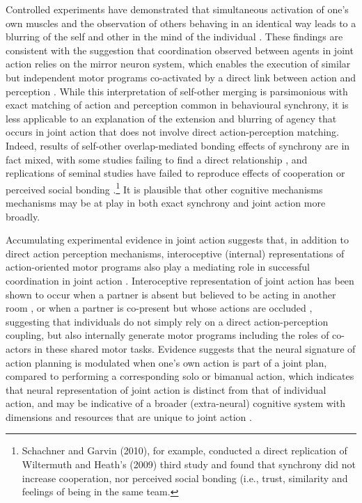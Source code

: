 Controlled experiments have demonstrated that simultaneous activation of one's own muscles and the observation of others behaving in an identical way leads to a blurring of the self and other in the mind of the individual \citep{Hurley2008,Rizzolatti2004}. These findings are consistent with the suggestion that coordination observed between agents in joint action relies on the mirror neuron system, which enables the execution of similar but independent motor programs co-activated by a direct link between action and perception \citep{Rizzolatti2004}.
While this interpretation of self-other merging is parsimonious with exact matching of action and perception common in behavioural synchrony, it is less applicable to an explanation of the extension and blurring of agency that occurs in joint action that does not involve direct action-perception matching. Indeed, results of self-other overlap-mediated bonding effects of synchrony are in fact mixed, with some studies failing to find a direct relationship \citep{Cohen2013a,Reddish2013a}, and replications of seminal studies have failed to reproduce effects of cooperation or perceived social bonding \citep{Dam2012,Schachner2010}.\footnote{Schachner and Garvin (2010), for example, conducted a direct replication of Wiltermuth and Heath's (2009) third study and found that synchrony did not increase cooperation, nor perceived social bonding (i.e., trust, similarity and feelings of being in the same team.} It is plausible that other cognitive mechanisms mechanisms may be at play in both exact synchrony and joint action more broadly.

Accumulating experimental evidence in joint action suggests that, in addition to direct action perception mechanisms, interoceptive (internal) representations of action-oriented motor programs also play a mediating role in successful coordination in joint action \citep{Moreau2016}.  Interoceptive representation of joint action has been shown to occur when a partner is absent but believed to be acting in another room \citep{Milward2014}, or when a partner is co-present but whose actions are occluded \citep{Atmaca2011}, suggesting that individuals do not simply rely on a direct action-perception coupling, but also internally generate motor programs including the roles of co-actors in these shared motor tasks.
Evidence suggests that the neural signature of action planning is modulated when one's own action is part of a joint plan, compared to performing a corresponding solo or bimanual action, which indicates that neural representation of joint action is distinct from that of individual action, and may be indicative of a broader (extra-neural) cognitive system with dimensions and resources that are unique to joint action \citep{Kourtis2014}.


